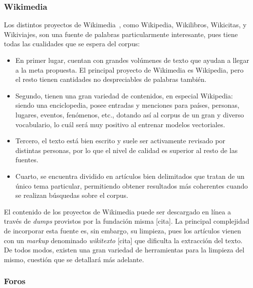 \subsubsection{Wikimedia}

Los distintos proyectos de Wikimedia~\cite{Wikimedia}, como Wikipedia, Wikilibros, Wikicitas, y
Wikiviajes, son una fuente de palabras particularmente interesante, pues tiene todas las cualidades
que se espera del corpus:

\begin{itemize}

\item En primer lugar, cuentan con grandes volúmenes de texto que ayudan a llegar a la meta
propuesta. El principal proyecto de Wikimedia es Wikipedia, pero el resto tienen cantidades no
despreciables de palabras también.

\item Segundo, tienen una gran variedad de contenidos, en especial Wikipedia: siendo una
enciclopedia, posee entradas y menciones para países, personas, lugares, eventos, fenómenos, etc.,
dotando así al corpus de un gran y diverso vocabulario, lo cuál será muy positivo al entrenar
modelos vectoriales.

\item Tercero, el texto está bien escrito y suele ser activamente revisado por distintas personas,
por lo que el nivel de calidad es superior al resto de las fuentes.

\item Cuarto, se encuentra dividido en artículos bien delimitados que tratan de un único tema
particular, permitiendo obtener resultados más coherentes cuando se realizan búsquedas sobre el
corpus.

\end{itemize}


El contenido de los proyectos de Wikimedia puede ser descargado en línea a través de \textit{dumps}
provistos por la fundación misma [cita]. La principal complejidad de incorporar esta fuente es, sin
embargo, su limpieza, pues los artículos vienen con un \textit{markup} denominado \textit{wikitexto}
[cita] que dificulta la extracción del texto. De todos modos, existen una gran variedad de
herramientas para la limpieza del mismo, cuestión que se detallará más adelante.


\subsubsection{Foros}

